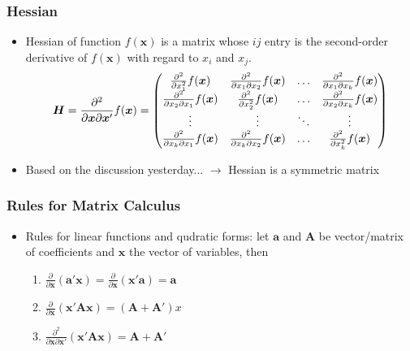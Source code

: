 \documentclass[pdflatex, 12pt]{beamer}
\begin{document}
\begin{frame}
\frametitle{Hessian}
\begin{itemize}
\item {\color{red} Hessian} of function $f(\bm{x})$ is a matrix whose $ij$ entry is the second-order derivative of $f(\bm{x})$ with regard to $x_i$ and $x_j$.
 {\small
 \begin{equation}
 \bm{H} = \frac{\partial^2}{\partial \bm{x} \partial \bm{x}'} f(\bm{x}) = \begin{pmatrix}
 \frac{\partial^2}{\partial x_1^2} f(\bm{x}) & \frac{\partial^2}{\partial x_1 \partial x_2} f(\bm{x}) & \ldots & \frac{\partial^2}{\partial x_1 \partial x_k} f(\bm{x}) \\
 \frac{\partial^2}{\partial x_2 \partial x_1} f(\bm{x}) & \frac{\partial^2}{\partial x_2^2} f(\bm{x}) & \ldots & \frac{\partial^2}{\partial x_2 \partial x_k} f(\bm{x}) \\
 \vdots & \vdots & \ddots & \vdots \\
 \frac{\partial^2}{\partial x_k \partial x_1} f(\bm{x}) & \frac{\partial^2}{\partial x_k \partial x_2} f(\bm{x}) & \ldots & \frac{\partial^2}{\partial x_k^2} f(\bm{x}) \\
 \end{pmatrix} \notag
 \end{equation}
 }
\item Based on the discussion yesterday... $\rightarrow$ Hessian is a symmetric matrix
\end{itemize}
\end{frame}

\begin{frame}
\frametitle{Rules for Matrix Calculus}
\begin{itemize}
\item Rules for linear functions and qudratic forms: let $\bm{a}$ and $\bm{A}$ be vector/matrix of coefficients and $\bm{x}$ the vector of variables, then
 \begin{enumerate}
 \item $\frac{\partial}{\partial \bm{x}} (\bm{a'x}) = \frac{\partial}{\partial \bm{x}} (\bm{x'a}) = \bm{a}$
 \item $\frac{\partial}{\partial \bm{x}} (\bm{x'Ax}) = (\bm{A} + \bm{A'})x$
 \item $\frac{\partial^2}{\partial \bm{x}\partial \bm{x}'} (\bm{x'Ax}) = \bm{A} + \bm{A'}$
 \end{enumerate}
\end{itemize}
\end{frame}
\end{document}
